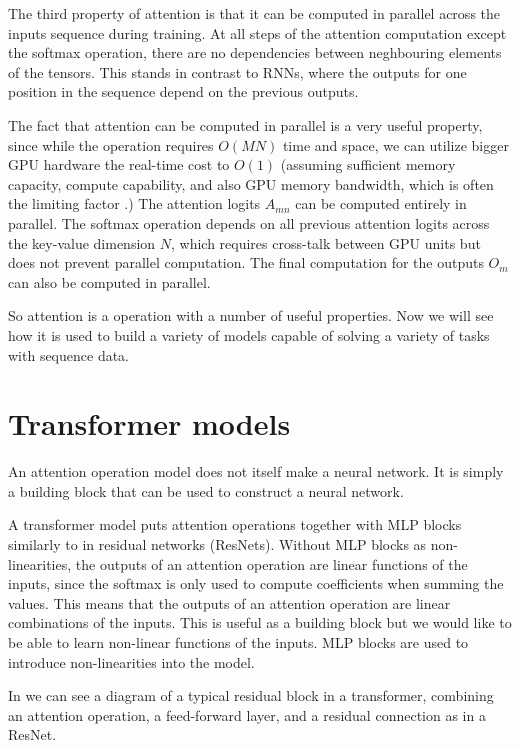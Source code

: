 The third property of attention is that it can be computed in parallel across the inputs sequence during training. At all steps of the attention computation except the softmax operation, there are no dependencies between neghbouring elements of the tensors. This stands in contrast to RNNs, where the outputs for one position in the sequence depend on the previous outputs.

The fact that attention can be computed in parallel is a very useful property, since while the operation requires $O(MN)$ time and space, we can utilize bigger GPU hardware the real-time cost to $O(1)$ (assuming sufficient memory capacity, compute capability, and also GPU memory bandwidth, which is often the limiting factor \cite{multi-query-attn}.) The attention logits $A_{mn}$ can be computed entirely in parallel. The softmax operation depends on all previous attention logits across the key-value dimension $N$, which requires cross-talk between GPU units but does not prevent parallel computation. The final computation for the outputs $O_m$ can also be computed in parallel.

So attention is a operation with a number of useful properties. Now we will see how it is used to build a variety of models capable of solving a variety of tasks with sequence data.

\section{Transformer models}

An attention operation model does not itself make a neural network. It is simply a building block that can be used to construct a neural network.

A transformer model puts attention operations together with MLP blocks similarly to in residual networks (ResNets). Without MLP blocks as non-linearities, the outputs of an attention operation are linear functions of the inputs, since the softmax is only used to compute coefficients when summing the values. This means that the outputs of an attention operation are linear combinations of the inputs. This is useful as a building block but we would like to be able to learn non-linear functions of the inputs. MLP blocks are used to introduce non-linearities into the model.

In  we can see a diagram of a typical residual block in a transformer, combining an attention operation, a feed-forward layer, and a residual connection as in a ResNet.

